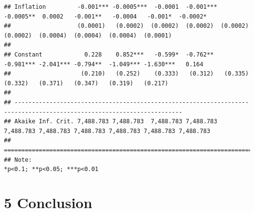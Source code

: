 \documentclass[]{interact}
\theoremstyle{plain}%
\theoremstyle{definition}
\theoremstyle{remark}
\begin{document}
\begin{verbatim}
## Inflation         -0.001*** -0.0005***  -0.0001  -0.001*** -0.0005**  0.0002   -0.001**   -0.0004   -0.001*  -0.0002* 
##                   (0.0001)   (0.0002)  (0.0002)  (0.0002)  (0.0002)  (0.0002)  (0.0004)  (0.0004)  (0.0004)  (0.0001) 
##                                                                                                                       
## Constant            0.228    0.852***   -0.599*  -0.762**  -0.981*** -2.041*** -0.794**  -1.049*** -1.630***   0.164  
##                    (0.210)   (0.252)    (0.333)   (0.312)   (0.335)   (0.332)   (0.371)   (0.347)   (0.319)   (0.217) 
##                                                                                                                       
## ----------------------------------------------------------------------------------------------------------------------
## Akaike Inf. Crit. 7,488.783 7,488.783  7,488.783 7,488.783 7,488.783 7,488.783 7,488.783 7,488.783 7,488.783 7,488.783
## ======================================================================================================================
## Note:                                                                                      *p<0.1; **p<0.05; ***p<0.01
\end{verbatim}

\hypertarget{conclusion}{%
\section{5 Conclusion}\label{conclusion}}




\end{document}
